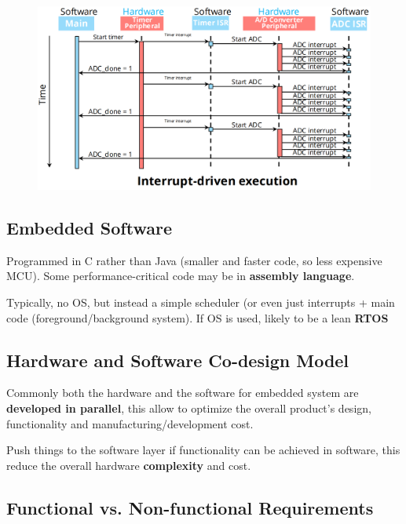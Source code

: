\begin{minipage}{\linewidth}
      \begin{minipage}{0.65\linewidth}
          \begin{figure}[H]
                \centering
                \includegraphics[width=1\linewidth]{img/image7.png}
          \end{figure}
      \end{minipage}
  \end{minipage}


\subsection{Embedded Software}

Programmed in C rather than Java (smaller and faster code, so less expensive MCU). Some performance-critical code may be in \textbf{assembly language}.

Typically, no OS, but instead a simple scheduler (or even just interrupts + main
code (foreground/background system). If OS is used, likely to be a lean \textbf{RTOS}


\subsection{Hardware and Software Co-design Model}

Commonly both the hardware and the software for embedded system are \textbf{developed in parallel}, this allow to optimize the overall
product's design, functionality and manufacturing/development cost.

Push things to the software layer if functionality can be achieved in software, this reduce  the  overall hardware \textbf{complexity} and cost.

\subsection{Functional vs. Non-functional Requirements}

